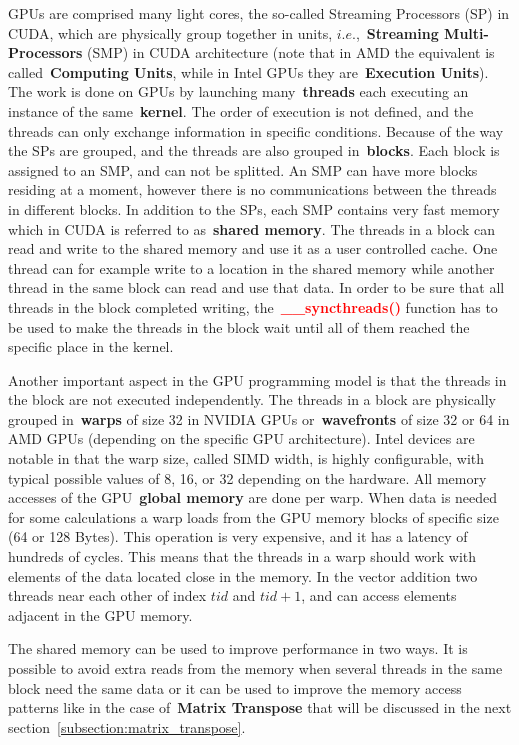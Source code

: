\par
GPUs are comprised many light cores, the so-called Streaming Processors (SP) in CUDA, which are physically group together in units, $i.e.$,~\textbf{Streaming Multi-Processors} (SMP) in CUDA architecture (note that in AMD the equivalent is called~\textbf{Computing Units}, while in Intel GPUs they are~\textbf{Execution Units}).
The work is done on GPUs by launching many~\textbf{threads} each executing an instance of the same~\textbf{kernel}.
The order of execution is not defined, and the threads can only exchange information in specific conditions.
Because of the way the SPs are grouped, and the threads are also grouped in~\textbf{blocks}.
Each block is assigned to an SMP, and can not be splitted.
An SMP can have more blocks residing at a moment, however there is no communications between the threads in different blocks.
In addition to the SPs, each SMP contains very fast memory which in CUDA is referred to as~\textbf{shared memory}.
The threads in a block can read and write to the shared memory and use it as a user controlled cache.
One thread can for example write to a location in the shared memory while another thread in the same block can read and use that data.
In order to be sure that all threads in the block completed writing, the~\textbf{\textcolor{red}{\_\_syncthreads()}} function has to be used to make the threads in the block wait until all of them reached the specific place in the kernel.


\par
Another important aspect in the GPU programming model is that the threads in the block are not executed independently.
The threads in a block are physically grouped in~\textbf{warps} of size 32 in NVIDIA GPUs or~\textbf{wavefronts} of size 32 or 64 in AMD GPUs (depending on the specific GPU architecture).
Intel devices are notable in that the warp size, called SIMD width, is highly configurable, with typical possible values of 8, 16, or 32 depending on the hardware.
All memory accesses of the GPU~\textbf{global memory} are done per warp.
When data is needed for some calculations a warp loads from the GPU memory blocks of specific size (64 or 128 Bytes).
This operation is very expensive, and it has a latency of hundreds of cycles. 
This means that the threads in a warp should work with elements of the data located close in the memory.
In the vector addition two threads near each other of index $tid$ and $tid+1$, and can access elements adjacent in the GPU memory.


\par
The shared memory can be used to improve performance in two ways.
It is possible to avoid extra reads from the memory when several threads in the same block need the same data or it can be used to improve the memory access patterns like in the case of~\textbf{Matrix Transpose} that will be discussed in the next section~\ref{subsection:matrix_transpose}.


